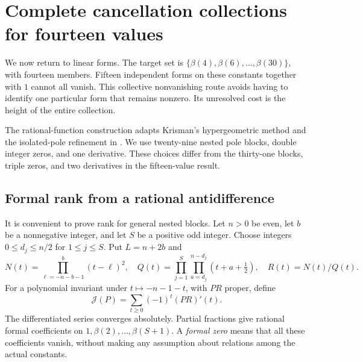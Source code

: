 \section{Complete cancellation collections for fourteen values}\label{sec:linear}
We now return to linear forms. The target set is
$\{\beta(4),\beta(6),\ldots,\beta(30)\}$, with fourteen members.
Fifteen independent forms on these constants together with $1$ cannot
all vanish. This collective nonvanishing route avoids having to identify
one particular form that remains nonzero. Its unresolved cost is the
height of the entire collection.

The rational-function construction adapts Krisman's hypergeometric
method \cite{Krisman} and the isolated-pole refinement in
\cite{fifteen}. We use twenty-nine nested pole blocks, double integer
zeros, and one derivative. These choices differ from the thirty-one
blocks, triple zeros, and two derivatives in the fifteen-value result.

\subsection{Formal rank from a rational antidifference}
It is convenient to prove rank for general nested blocks. Let $n>0$
be even, let $b$ be a nonnegative integer, and let $S$ be a positive
odd integer. Choose integers $0\leq d_j\leq n/2$ for $1\leq j\leq S$.
Put $L=n+2b$ and
\[
 N(t)=\prod_{\ell=-n-b-1}^{b}(t-\ell)^2,\quad
 Q(t)=\prod_{j=1}^S\prod_{a=d_j}^{n-d_j}(t+a+\tfrac12),
 \quad R(t)=N(t)/Q(t).
\]
For a polynomial invariant under $t\mapsto-n-1-t$, with $PR$ proper,
define
\[
 \mathcal J(P)=\sum_{t\geq0}(-1)^t(PR)'(t).
\]
The differentiated series converges absolutely. Partial fractions
give rational formal coefficients on $1,\beta(2),\ldots,\beta(S+1)$.
A \emph{formal zero} means that all these coefficients vanish, without
making any assumption about relations among the actual constants.


